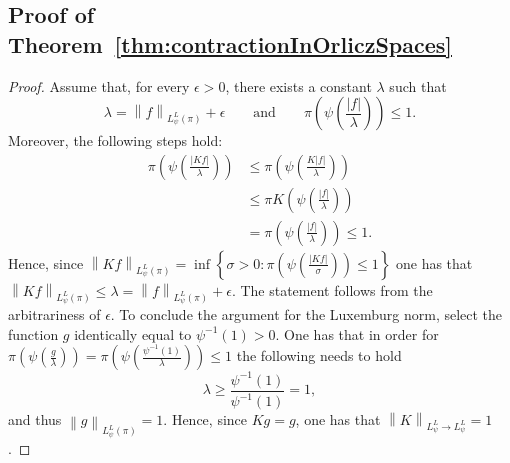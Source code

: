 \documentclass[11pt]{article}
\theoremstyle{plain}
\theoremstyle{remark}
\begin{document}
\subsection{Proof of Theorem~\ref{thm:contractionInOrliczSpaces}}\label{app:contractionInOrliczSpaces}
\begin{proof}
    Assume that, for every $\epsilon>0$, there exists a constant $\lambda$ such that 
     \begin{equation}
        \lambda = \left\lVert f \right\rVert_{L^L_\psi(\pi)} + \epsilon
        \hspace{2em} \text{and} \hspace{2em}
        \pi\left(\psi\left(\frac{|f|}{\lambda}\right)\right)\leq 1.
    \end{equation}
    Moreover, the following steps hold:
    \begin{align}
         \pi\left(\psi\left(\frac{|Kf|}{\lambda}\right)\right) 
        &\leq \pi\left(\psi\left(\frac{K|f|}{\lambda}\right)\right)
        \\
        &\leq \pi K\left(\psi\left(\frac{|f|}{\lambda}\right)\right) \\
        &= \pi\left(\psi\left(\frac{|f|}{\lambda}\right)\right) \leq 1.
    \end{align}
    Hence, since $\left\lVert Kf \right\rVert_{L_\psi^L(\pi)} = \inf\left\{\sigma>0: \pi\left(\psi\left(\frac{|Kf|}{\sigma}\right)\right) \leq 1 \right\} $ one has that $\left\lVert Kf \right\rVert_{L_\psi^L(\pi)} \leq \lambda = \left\lVert f \right\rVert_{L_\psi^L(\pi)} + \epsilon$. The statement follows from the arbitrariness of $\epsilon$. 
    To conclude the argument for the Luxemburg norm, select the function $g$ identically equal to $\psi^{-1}(1)>0$. One has that in order for $\pi\left(\psi\left(\frac{g}{\lambda}\right)\right) = \pi\left(\psi\left(\frac{\psi^{-1}(1)}{\lambda}\right)\right) \leq 1$ the following needs to hold  
    \begin{equation}
        \lambda \geq \frac{\psi^{-1}(1)}{\psi^{-1}(1)} = 1,
    \end{equation}  
    and thus $\left\lVert g \right\rVert_{L^L_\psi(\pi)} = 1$. Hence, since $Kg=g$,  one has that $\left\lVert K \right\rVert_{L_\psi^L \to L_\psi^L} = 1$.
    

\end{proof}
\end{document}
